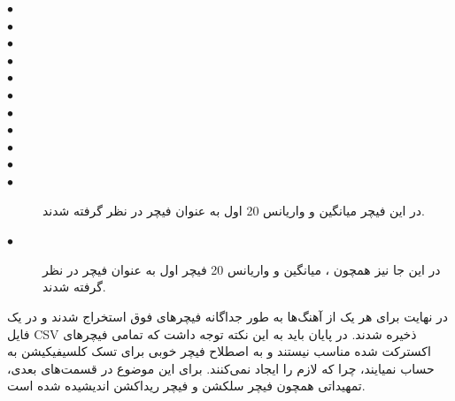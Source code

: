 \begin{description}

    \item[$\bullet$] 
    \item[$\bullet$]  
    \item[$\bullet$] 
    \item[$\bullet$] 
    \item[$\bullet$] 
    \item[$\bullet$] 
    \item[$\bullet$] 
    \item[$\bullet$] 
    \item[$\bullet$]   
    \item[$\bullet$] 
    \item[$\bullet$] 
    در این فیچر میانگین و واریانس 20  اول به عنوان فیچر در نظر گرفته شدند.
    \item[$\bullet$]  
    در این جا نیز همچون ، میانگین و واریانس 20 فیچر اول به عنوان فیچر در نظر گرفته شدند.

\end{description}

در نهایت برای هر یک از آهنگ‌ها به طور جداگانه فیچرهای فوق استخراج شدند و در یک فایل CSV ذخیره شدند.
در پایان باید به این نکته توجه داشت که تمامی فیچرهای اکسترکت شده مناسب نیستند و به اصطلاح فیچر خوبی برای تسک کلسیفیکیشن به حساب نمیایند، چرا که 
 لازم را ایجاد نمی‌کنند. برای این موضوع در قسمت‌های بعدی، تمهیداتی همچون فیچر سلکشن و فیچر ریداکشن اندیشیده شده است.

